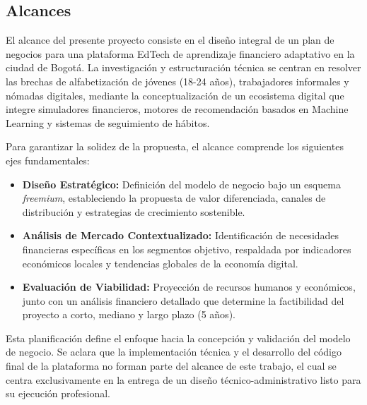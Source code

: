 {}
\subsection*{Alcances}


El alcance del presente proyecto consiste en el diseño integral de un plan de negocios para una plataforma EdTech de aprendizaje financiero adaptativo en la ciudad de Bogotá. La investigación y estructuración técnica se centran en resolver las brechas de alfabetización de jóvenes (18-24 años), trabajadores informales y nómadas digitales, mediante la conceptualización de un ecosistema digital que integre simuladores financieros, motores de recomendación basados en Machine Learning y sistemas de seguimiento de hábitos.

Para garantizar la solidez de la propuesta, el alcance comprende los siguientes ejes fundamentales:

\begin{itemize}
	\item \textbf{Diseño Estratégico:} Definición del modelo de negocio bajo un esquema \textit{freemium}, estableciendo la propuesta de valor diferenciada, canales de distribución y estrategias de crecimiento sostenible.
	
	\item \textbf{Análisis de Mercado Contextualizado:} Identificación de necesidades financieras específicas en los segmentos objetivo, respaldada por indicadores económicos locales y tendencias globales de la economía digital.
	
	
	\item \textbf{Evaluación de Viabilidad:} Proyección de recursos humanos y económicos, junto con un análisis financiero detallado que determine la factibilidad del proyecto a corto, mediano y largo plazo (5 años).
\end{itemize}

Esta planificación define el enfoque hacia la concepción y validación del modelo de negocio. Se aclara que la implementación técnica y el desarrollo del código final de la plataforma no forman parte del alcance de este trabajo, el cual se centra exclusivamente en la entrega de un diseño técnico-administrativo listo para su ejecución profesional.